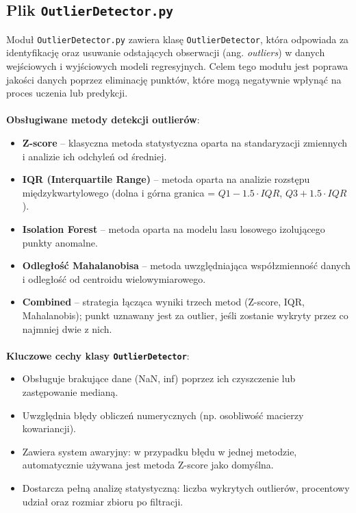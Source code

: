 \documentclass{classrep}
\begin{document}
\clearpage{}
\subsection{Plik \texttt{OutlierDetector.py}}

Moduł \texttt{OutlierDetector.py} zawiera klasę \texttt{OutlierDetector}, która odpowiada za identyfikację oraz usuwanie odstających obserwacji (ang. \textit{outliers}) w danych wejściowych i wyjściowych modeli regresyjnych. Celem tego modułu jest poprawa jakości danych poprzez eliminację punktów, które mogą negatywnie wpłynąć na proces uczenia lub predykcji.

\paragraph{}
\textbf{Obsługiwane metody detekcji outlierów}:
\begin{itemize}
	\item \textbf{Z-score} – klasyczna metoda statystyczna oparta na standaryzacji zmiennych i analizie ich odchyleń od średniej.
	\item \textbf{IQR (Interquartile Range)} – metoda oparta na analizie rozstępu międzykwartylowego (dolna i górna granica = $Q1 - 1.5 \cdot IQR$, $Q3 + 1.5 \cdot IQR$).
	\item \textbf{Isolation Forest} – metoda oparta na modelu lasu losowego izolującego punkty anomalne.
	\item \textbf{Odległość Mahalanobisa} – metoda uwzględniająca współzmienność danych i odległość od centroidu wielowymiarowego.
	\item \textbf{Combined} – strategia łącząca wyniki trzech metod (Z-score, IQR, Mahalanobis); punkt uznawany jest za outlier, jeśli zostanie wykryty przez co najmniej dwie z nich.
\end{itemize}

\paragraph{}
\textbf{Kluczowe cechy klasy \texttt{OutlierDetector}}:
\begin{itemize}
	\item Obsługuje brakujące dane (NaN, inf) poprzez ich czyszczenie lub zastępowanie medianą.
	\item Uwzględnia błędy obliczeń numerycznych (np. osobliwość macierzy kowariancji).
	\item Zawiera system awaryjny: w przypadku błędu w jednej metodzie, automatycznie używana jest metoda Z-score jako domyślna.
	\item Dostarcza pełną analizę statystyczną: liczba wykrytych outlierów, procentowy udział oraz rozmiar zbioru po filtracji.
\end{itemize}
\end{document}
